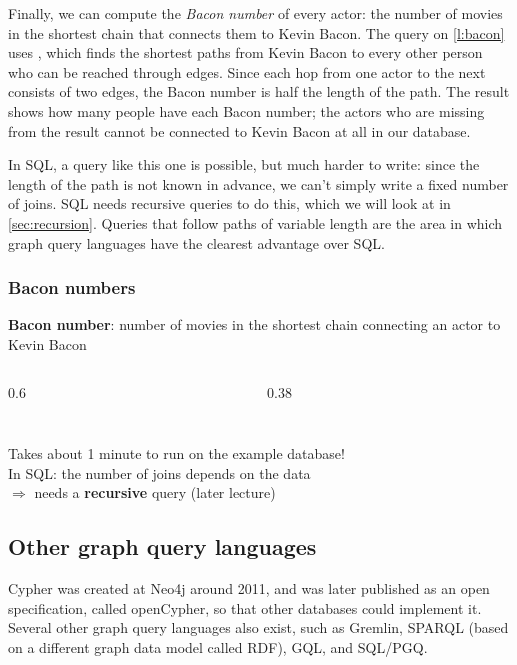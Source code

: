 Finally, we can compute the \emph{Bacon number} of every actor: the number of movies in the shortest chain that connects them to Kevin Bacon.
The query on \autoref{l:bacon} uses , which finds the shortest paths from Kevin Bacon to every other person who can be reached through  edges.
Since each hop from one actor to the next consists of two edges, the Bacon number is half the length of the path.
The result shows how many people have each Bacon number; the actors who are missing from the result cannot be connected to Kevin Bacon at all in our database.

In SQL, a query like this one is possible, but much harder to write: since the length of the path is not known in advance, we can't simply write a fixed number of joins.
SQL needs recursive queries to do this, which we will look at in \autoref{sec:recursion}.
Queries that follow paths of variable length are the area in which graph query languages have the clearest advantage over SQL.

\begin{frame}
    \label{s:bacon}
    \frametitle{Bacon numbers}
    \textbf{Bacon number}: number of movies in the shortest chain connecting an actor to Kevin Bacon
    \begin{columns}[T,onlytextwidth]
        \begin{column}{0.6\textwidth}
            \inputminted[fontsize=\scriptsize]{cypher}{code/graph-bacon.cypher}
        \end{column}
        \begin{column}{0.38\textwidth}
            {\scriptsize}
        \end{column}
    \end{columns}
    \vspace{1em}
    Takes about 1 minute to run on the example database!\\[1em]\pause
    In SQL: the number of joins depends on the data\\
    $\Rightarrow$ needs a \textbf{recursive} query (later lecture)
\end{frame}
\label{l:bacon}


\subsection{Other graph query languages}\label{sec:gql}

Cypher was created at Neo4j around 2011, and was later published as an open specification, called openCypher, so that other databases could implement it.
Several other graph query languages also exist, such as Gremlin, SPARQL (based on a different graph data model called RDF), GQL, and SQL/PGQ.

